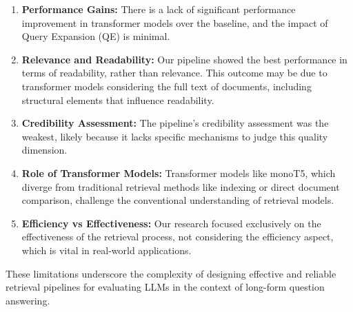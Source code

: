 \begin{enumerate}
    \item \textbf{Performance Gains:} There is a lack of significant performance improvement in transformer models over the baseline, and the impact of Query Expansion (QE) is minimal.
    \item \textbf{Relevance and Readability:} Our pipeline showed the best performance in terms of readability, rather than relevance. This outcome may be due to transformer models considering the full text of documents, including structural elements that influence readability.
    \item \textbf{Credibility Assessment:} The pipeline's credibility assessment was the weakest, likely because it lacks specific mechanisms to judge this quality dimension.
    \item \textbf{Role of Transformer Models:} Transformer models like monoT5, which diverge from traditional retrieval methods like indexing or direct document comparison, challenge the conventional understanding of retrieval models.
    \item \textbf{Efficiency vs Effectiveness:} Our research focused exclusively on the effectiveness of the retrieval process, not considering the efficiency aspect, which is vital in real-world applications.
\end{enumerate}

These limitations underscore the complexity of designing effective and reliable retrieval pipelines for evaluating LLMs in the context of long-form question answering.


